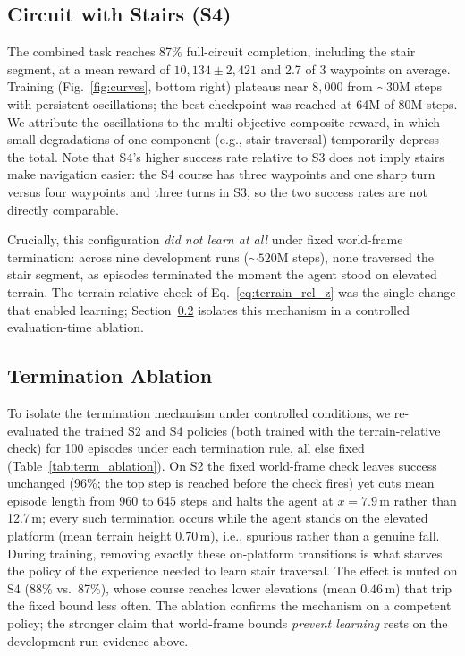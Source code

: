 \documentclass[conference,a4paper]{IEEEtran}
\begin{document}
\subsection{Circuit with Stairs (S4)}
The combined task reaches 87\% full-circuit completion, including the stair segment, at a mean reward of $10{,}134 \pm 2{,}421$ and 2.7 of 3 waypoints on average. Training (Fig.~\ref{fig:curves}, bottom right) plateaus near $8{,}000$ from ${\sim}30$M steps with persistent oscillations; the best checkpoint was reached at 64M of 80M steps. We attribute the oscillations to the multi-objective composite reward, in which small degradations of one component (e.g., stair traversal) temporarily depress the total. Note that S4's higher success rate relative to S3 does not imply stairs make navigation easier: the S4 course has three waypoints and one sharp turn versus four waypoints and three turns in S3, so the two success rates are not directly comparable.

Crucially, this configuration \emph{did not learn at all} under fixed world-frame termination: across nine development runs (${\sim}520$M steps), none traversed the stair segment, as episodes terminated the moment the agent stood on elevated terrain. The terrain-relative check of Eq.~\eqref{eq:terrain_rel_z} was the single change that enabled learning; Section~\ref{sec:term_ablation} isolates this mechanism in a controlled evaluation-time ablation.

\subsection{Termination Ablation}
\label{sec:term_ablation}
To isolate the termination mechanism under controlled conditions, we re-evaluated the trained S2 and S4 policies (both trained with the terrain-relative check) for 100 episodes under each termination rule, all else fixed (Table~\ref{tab:term_ablation}). On S2 the fixed world-frame check leaves success unchanged (96\%; the top step is reached before the check fires) yet cuts mean episode length from 960 to 645 steps and halts the agent at $x{=}7.9$\,m rather than 12.7\,m; every such termination occurs while the agent stands on the elevated platform (mean terrain height $0.70$\,m), i.e., spurious rather than a genuine fall. During training, removing exactly these on-platform transitions is what starves the policy of the experience needed to learn stair traversal. The effect is muted on S4 (88\% vs.\ 87\%), whose course reaches lower elevations (mean $0.46$\,m) that trip the fixed bound less often. The ablation confirms the mechanism on a competent policy; the stronger claim that world-frame bounds \emph{prevent learning} rests on the development-run evidence above.
\end{document}
